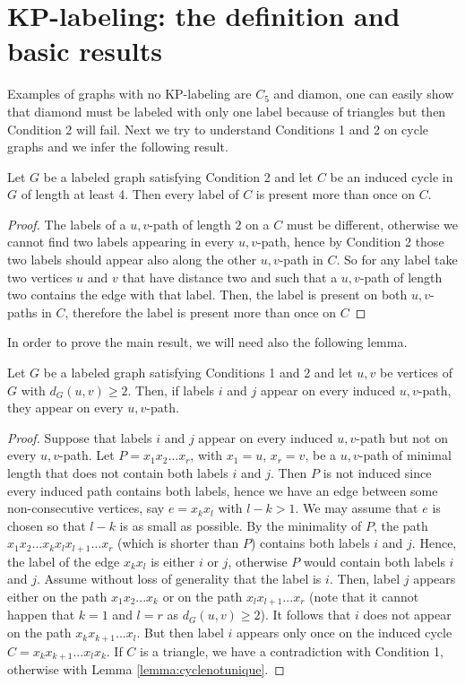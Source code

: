 \documentclass[12pt,a4paper,titlepage,openany]{report}
\begin{document}
\section{KP-labeling: the definition and basic results}
Examples of graphs with no KP-labeling are $C_5$ and diamon, one can easily show that diamond must be labeled with only one label because of triangles but then Condition 2 will fail.\newline 
Next we try to understand Conditions 1 and 2 on cycle graphs and we infer the following result.
\begin{lemma}\label{lemma:cyclenotunique}Let $G$ be a labeled graph satisfying Condition 2 and let $C$ be an induced cycle in $G$ of length at least 4. Then every label of $C$ is present more than once on $C$.
\end{lemma}
\begin{proof}
The labels of a $u, v$-path of length $2$ on a $C$ must be different, otherwise we cannot find two labels appearing in every $u,v$-path, hence by Condition 2 those two labels should appear also along the other $u,v$-path in $C$. So for any label take two vertices $u$ and $v$ that have distance two and such that a $u,v$-path of length two contains the edge with that label. Then, the label is present on both $u,v$-paths in $C$, therefore the label is present more than once on $C$ 
\end{proof}
In order to prove the main result, we will need also the following lemma.
\begin{lemma}\label{lemma:inducedpaths}Let $G$ be a labeled graph satisfying Conditions 1 and 2 and let $u, v$ be vertices of $G$ with $d_G(u,v)\geq 2$. Then, if labels $i$ and $j$ appear on every induced $u, v$-path, they appear on every $u, v$-path.
\end{lemma}
\begin{proof}
Suppose that labels $i$ and $j$ appear on every induced \textsc{$u, v$}-path but not on every $u, v$-path. Let $P=x_1x_2\ldots x_r$, with $x_1=u$, $x_r=v$, be a $u, v$-path of minimal length that does not contain both labels $i$ and $j$. Then $P$ is not induced since every induced path contains both labels, hence we have an edge between some non-consecutive vertices, say $e=x_kx_l$ with $l-k>1$. We may assume that $e$ is chosen so that $l-k$ is as small as possible. By the minimality of $P$, the path $x_1x_2\ldots x_kx_lx_{l+1}\ldots x_r$ (which is shorter than $P$) contains both labels $i$ and $j$. Hence, the label of the edge $x_kx_l$ is either $i$ or $j$, otherwise $P$ would contain both labels $i$ and $j$. Assume without loss of generality that the label is $i$. Then, label $j$ appears either on the path $x_1x_2...x_k$ or on the path $x_lx_{l+1}...x_r$ (note that it cannot happen that $k=1$ and $l=r$ as $d_G(u,v)\geq 2$). It follows that $i$ does not appear on the path $x_kx_{k+1}...x_l$. But then label $i$ appears only once on the induced cycle $C=x_kx_{k+1}...x_lx_k$. If $C$ is a triangle, we have a contradiction with Condition 1, otherwise with Lemma \ref{lemma:cyclenotunique}.
\end{proof}
\end{document}
